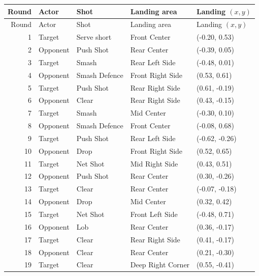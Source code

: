 \begin{longtable}{rlllp{2.1cm}}
\toprule
Round & Actor & Shot & Landing area & Landing $(x,y)$ \\
\midrule
\endfirsthead
\toprule
Round & Actor & Shot & Landing area & Landing $(x,y)$ \\
\midrule
\endhead
1 & Target & Serve short & Front Center & (-0.20, 0.53) \\
2 & Opponent & Push Shot & Rear Center & (-0.39, 0.05) \\
3 & Target & Smash & Rear Left Side & (-0.48, 0.01) \\
4 & Opponent & Smash Defence & Front Right Side & (0.53, 0.61) \\
5 & Target & Push Shot & Rear Right Side & (0.61, -0.19) \\
6 & Opponent & Clear & Rear Right Side & (0.43, -0.15) \\
7 & Target & Smash & Mid Center & (-0.30, 0.10) \\
8 & Opponent & Smash Defence & Front Center & (-0.08, 0.68) \\
9 & Target & Push Shot & Rear Left Side & (-0.62, -0.26) \\
10 & Opponent & Drop & Front Right Side & (0.52, 0.65) \\
11 & Target & Net Shot & Mid Right Side & (0.43, 0.51) \\
12 & Opponent & Push Shot & Rear Center & (0.30, -0.26) \\
13 & Target & Clear & Rear Center & (-0.07, -0.18) \\
14 & Opponent & Drop & Mid Center & (0.32, 0.42) \\
15 & Target & Net Shot & Front Left Side & (-0.48, 0.71) \\
16 & Opponent & Lob & Rear Center & (0.36, -0.17) \\
17 & Target & Clear & Rear Right Side & (0.41, -0.17) \\
18 & Opponent & Clear & Rear Center & (0.21, -0.30) \\
19 & Target & Clear & Deep Right Corner & (0.55, -0.41) \\
\bottomrule
\end{longtable}

